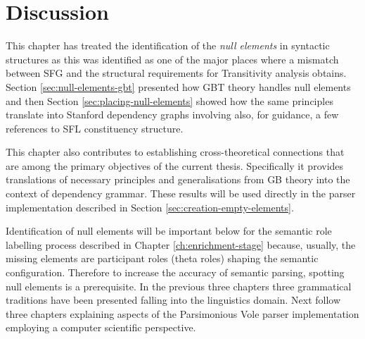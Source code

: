 \section{Discussion}
    This chapter has treated the identification of the \textit{null elements} in syntactic structures as this was identified as one of the major places where a mismatch between SFG and the structural requirements for Transitivity analysis obtains. Section \ref{sec:null-elements-gbt} presented how GBT theory handles null elements and then Section \ref{sec:placing-null-elements} showed how the same principles translate into Stanford dependency graphs involving also, for guidance, a few references to SFL constituency structure.

    This chapter also contributes to establishing cross-theoretical connections that are among the primary objectives of the current thesis. Specifically it provides translations of necessary principles and generalisations from GB theory into the context of dependency grammar. These results will be used directly in the parser implementation described in Section \ref{sec:creation-empty-elements}.

    Identification of null elements will be important below for the semantic role labelling process described in Chapter \ref{ch:enrichment-stage} because, usually, the missing elements are participant roles (theta roles) shaping the semantic configuration. Therefore to increase the accuracy of semantic parsing, spotting null elements is a prerequisite.
    In the previous three chapters three grammatical traditions have been presented falling into the linguistics domain. Next follow three chapters explaining aspects of the Parsimonious Vole parser implementation employing a computer scientific perspective. 